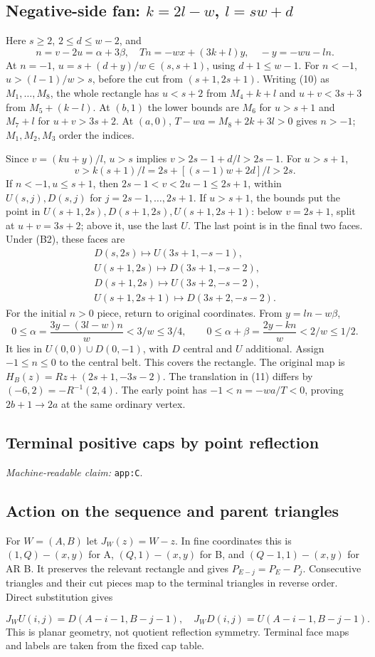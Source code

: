 \documentclass[11pt]{amsart}
\newcommand{\record}[1]{\nolinkurl{#1}}
\newcommand{\claimid}[1]{\par\nopagebreak\noindent\textit{Machine-readable claim:} \record{#1}.\par}
\begin{document}
\subsection{Negative-side fan: \texorpdfstring{$k=2l-w$, $l=sw+d$}{k=2l-w, l=sw+d}}
Here $s\ge2$, $2\le d\le w-2$, and
\[
n=v-2u=\alpha+3\beta,\quad Tn=-wx+(3k+l)y,\quad -y=-wu-ln.
\]
At $n=-1$, $u=s+(d+y)/w\in(s,s+1)$, using $d+1\le w-1$.
For $n<-1$, $u>(l-1)/w>s$, before the cut from $(s+1,2s+1)$.
Writing (10) as $M_1,\ldots,M_8$, the whole rectangle has
$u<s+2$ from $M_4+k+l$ and $u+v<3s+3$ from $M_5+(k-l)$.
At $(b,1)$ the lower bounds are $M_6$ for $u>s+1$ and $M_7+l$
for $u+v>3s+2$. At $(a,0)$, $T-wa=M_8+2k+3l>0$ gives $n>-1$;
$M_1,M_2,M_3$ order the indices.

Since $v=(ku+y)/l$, $u>s$ implies $v>2s-1+d/l>2s-1$.
For $u>s+1$,
\[
v>k(s+1)/l=2s+[(s-1)w+2d]/l>2s.
\]
If $n<-1,u\le s+1$, then $2s-1<v<2u-1\le2s+1$, within
$U(s,j),D(s,j)$ for $j=2s-1,\ldots,2s+1$. If $u>s+1$, the
bounds put the point in $U(s+1,2s),D(s+1,2s),U(s+1,2s+1)$:
below $v=2s+1$, split at $u+v=3s+2$; above it, use the last $U$.
The last point is in the final two faces. Under (B2), these faces are
\[
\begin{gathered}
 D(s,2s)\mapsto U(3s+1,-s-1),\\
 U(s+1,2s)\mapsto D(3s+1,-s-2),\\
 D(s+1,2s)\mapsto U(3s+2,-s-2),\\
 U(s+1,2s+1)\mapsto D(3s+2,-s-2).
\end{gathered}
\]
For the initial $n>0$ piece, return to original coordinates. From
$y=ln-w\beta$,
\[
0\le\alpha=\frac{3y-(3l-w)n}{w}<3/w\le3/4,\qquad
0\le\alpha+\beta=\frac{2y-kn}{w}<2/w\le1/2.
\]
It lies in $U(0,0)\cup D(0,-1)$, with $D$ central and $U$ additional.
Assign $-1\le n\le0$ to the central belt. This covers the rectangle.
The original map is $H_B(z)=Rz+(2s+1,-3s-2)$. The translation
in (11) differs by $(-6,2)=-R^{-1}(2,4)$. The early point has
$-1<n=-wa/T<0$, proving $2b+1\to2a$ at the same ordinary vertex.

\begin{samepage}\section{Terminal positive caps by point reflection}\label{app:C}
\claimid{app:C}
\subsection{Action on the sequence and parent triangles}
For $W=(A,B)$ let $J_W(z)=W-z$. In fine coordinates this is
$(1,Q)-(x,y)$ for A, $(Q,1)-(x,y)$ for B, and $(Q-1,1)-(x,y)$
for AR B. It preserves the relevant rectangle and gives
$P_{E-j}=P_E-P_j$. Consecutive triangles and their cut pieces map to
the terminal triangles in reverse order. Direct substitution gives\end{samepage}
\begin{equation}\label{eq:C1}
J_WU(i,j)=D(A-i-1,B-j-1),\quad
J_WD(i,j)=U(A-i-1,B-j-1).\tag{C1}
\end{equation}
This is planar geometry, not quotient reflection symmetry. Terminal
face maps and labels are taken from the fixed cap table.
\end{document}
